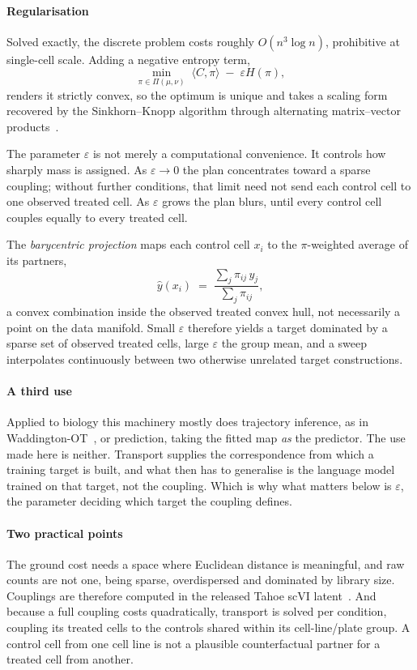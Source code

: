 \paragraph{Regularisation}
Solved exactly, the discrete problem costs roughly $O(n^3 \log n)$, prohibitive
at single-cell scale. Adding a negative entropy term,
\begin{equation}
  \min_{\pi \in \Pi(\mu,\nu)} \; \langle C, \pi \rangle \;-\;
  \varepsilon H(\pi),
\end{equation}
renders it strictly convex, so the optimum is unique and takes a scaling form
recovered by the Sinkhorn--Knopp algorithm through alternating matrix--vector
products~\cite{cuturi}.

The parameter $\varepsilon$ is not merely a computational convenience. It
controls how sharply mass is assigned. As $\varepsilon \rightarrow 0$ the plan
concentrates toward a sparse coupling; without further conditions, that limit
need not send each control cell to one observed treated cell. As $\varepsilon$
grows the plan blurs, until every control cell couples equally to every treated
cell.

The \emph{barycentric projection} maps each control cell $x_i$ to the
$\pi$-weighted average of its partners,
\begin{equation}
  \hat{y}(x_i) \;=\; \frac{\sum_j \pi_{ij}\, y_j}{\sum_j \pi_{ij}},
\end{equation}
a convex combination inside the observed treated convex hull, not necessarily a
point on the data manifold. Small $\varepsilon$ therefore yields a target
dominated by a sparse set of observed treated cells, large $\varepsilon$ the
group mean, and a sweep interpolates continuously between two otherwise unrelated
target constructions.

\paragraph{A third use} Applied to biology this machinery mostly does
trajectory inference, as in Wad\-ding\-ton-OT~\cite{schiebinger}, or prediction,
taking the fitted map \emph{as} the predictor. The use made here is neither.
Transport supplies the correspondence from which a training target is built, and
what then has to generalise is the language model trained on that target, not the
coupling. Which is why what matters below is $\varepsilon$, the parameter
deciding which target the coupling defines.

\paragraph{Two practical points} The ground cost needs a space where Euclidean
distance is meaningful, and raw counts are not one, being sparse, overdispersed
and dominated by library size. Couplings are therefore computed in the released
Tahoe scVI latent~\cite{scvi}. And because a full coupling costs quadratically,
transport is solved per condition, coupling its treated cells to the controls
shared within its cell-line/plate group. A control cell from one cell line is not
a plausible counterfactual partner for a treated cell from another.
